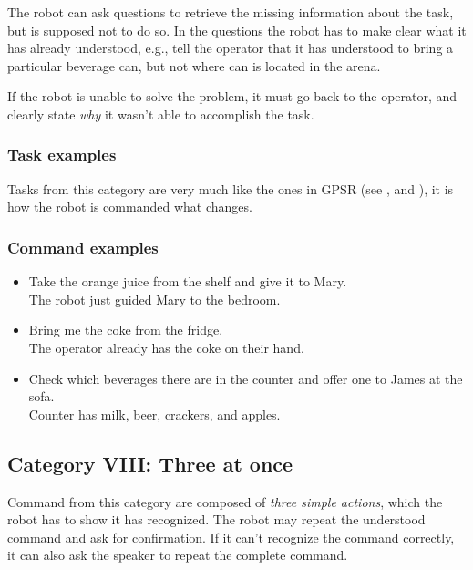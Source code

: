 The robot can ask questions to retrieve the missing information about the task, but is supposed not to do so. In the questions the robot has to make clear what it has already understood, e.g., tell the operator that it has understood to bring a particular beverage can, but not where can is located in the arena. 

If the robot is unable to solve the problem, it must go back to the operator, and clearly state \textit{why} it wasn't able to accomplish the task.


\subsubsection{Task examples}
Tasks from this category are very much like the ones in GPSR (see ,  and ), it is how the robot is commanded what changes.

\subsubsection{Command examples}
\begin{itemize}
	\item Take the orange juice from the shelf and give it to Mary. \\
	The robot just guided Mary to the bedroom. \\

	\item Bring me the coke from the fridge. \\
	The operator already has the coke on their hand. \\

	\item Check which beverages there are in the counter and offer one to James at the sofa. \\
	Counter has milk, beer, crackers, and apples.
\end{itemize}



%
%
\subsection{Category VIII: Three at once}
\label{sec:eegpsr-category8-explained}
Command from this category are composed of \textit{three simple actions}, which the robot has to show it has recognized. The robot may repeat the understood command and ask for confirmation. If it can't recognize the command correctly, it can also ask the speaker to repeat the complete command.

